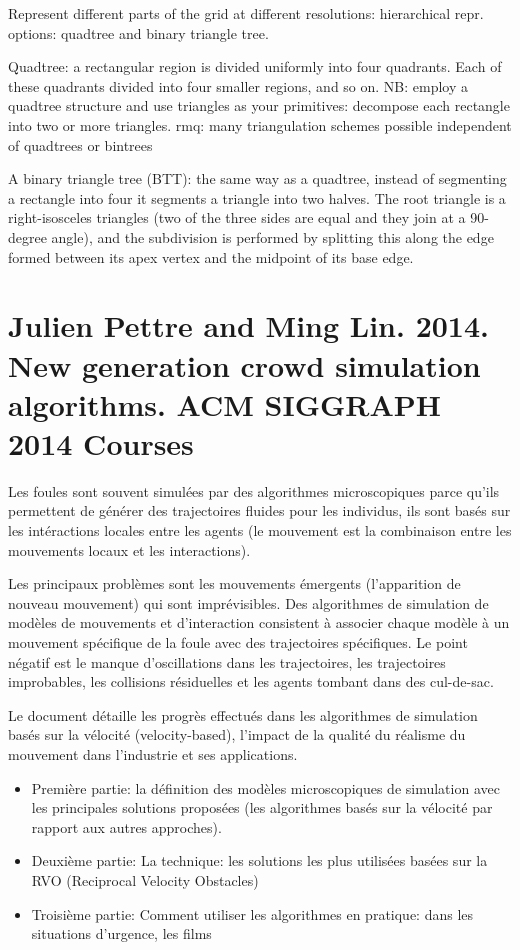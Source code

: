 \documentclass[11pt]{report}
\begin{document}
Represent different parts of the grid at different resolutions: hierarchical repr. options: quadtree and binary triangle tree.

Quadtree: a rectangular region is divided uniformly into four quadrants. Each of these quadrants divided into four smaller regions, and so on. 
NB: employ a quadtree structure and use triangles as your primitives: decompose each rectangle into two or more triangles.
rmq: many triangulation schemes possible independent of quadtrees or bintrees

A binary triangle tree (BTT): the same way as a quadtree, instead of segmenting a rectangle into four it segments a triangle into two halves. The root triangle is a right-isosceles triangles (two of the three sides are equal and they join at a 90-degree angle),  and the subdivision is performed by splitting this along the edge formed between its apex vertex and the midpoint of its base edge.





\part{Julien Pettre and Ming Lin. 2014. New generation crowd simulation algorithms. ACM SIGGRAPH 2014 Courses}

Les foules sont souvent simulées par des algorithmes microscopiques parce qu'ils permettent de générer des trajectoires fluides pour les individus, ils sont basés sur les intéractions locales entre les agents (le mouvement est la combinaison entre les mouvements locaux et les interactions).

Les principaux problèmes sont les mouvements émergents (l'apparition de nouveau mouvement) qui sont imprévisibles.
Des algorithmes de simulation de modèles de mouvements et d'interaction consistent à associer chaque modèle à  un mouvement spécifique de la foule avec des trajectoires spécifiques. Le point négatif est le manque d'oscillations dans les trajectoires, les trajectoires improbables, les collisions résiduelles et les agents tombant dans des cul-de-sac.

Le document détaille les progrès effectués dans les algorithmes de simulation basés sur la vélocité (velocity-based), l'impact de la qualité du réalisme du mouvement dans l'industrie et ses applications.

\begin{itemize}
\item Première partie: la définition des modèles microscopiques de simulation avec les principales solutions proposées (les algorithmes basés sur la vélocité par rapport aux autres approches).

\item Deuxième partie: La technique: les solutions les plus utilisées basées sur la RVO (Reciprocal Velocity Obstacles)

\item Troisième partie: Comment utiliser les algorithmes en pratique: dans les situations d'urgence, les films
\end{itemize}
\end{document}
